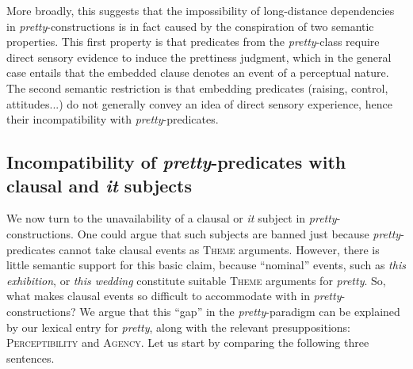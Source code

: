 \documentclass[11pt]{article}
\begin{document}
More broadly, this suggests that the impossibility of long-distance dependencies in \textit{pretty}-constructions is in fact caused by the conspiration of two semantic properties. This first property is that predicates from the \textit{pretty}-class require direct sensory evidence to induce the prettiness judgment, which in the general case entails that the embedded clause denotes an event of a perceptual nature. The second semantic restriction is that embedding predicates (raising, control, attitudes...) do not generally convey an idea of direct sensory experience, hence their incompatibility with \textit{pretty}-predicates.



\subsection{Incompatibility of \textit{pretty}-predicates with clausal and \textit{it} subjects}
We now turn to the unavailability of a clausal or \textit{it} subject in \textit{pretty}-constructions. One could argue that such subjects are banned just because \textit{pretty}-predicates cannot take clausal events as \textsc{Theme} arguments. However, there is little semantic support for this basic claim, because ``nominal'' events, such as \textit{this exhibition}, or \textit{this wedding} constitute suitable \textsc{Theme} arguments for \textit{pretty}. So, what makes clausal events so difficult to accommodate with in \textit{pretty}-constructions? We argue that this ``gap'' in the \textit{pretty}-paradigm can be explained by our lexical entry for \textit{pretty}, along with the relevant presuppositions: \textsc{Perceptibility} and \textsc{Agency}. Let us start by comparing the following three sentences.
\begin{exe}
	\ex 
	\begin{xlist}
		\label{ex:pretty-tangible-dp-interpretable}
		\label{ex:pretty-tangible-gerund-dp-interpretable}
		\label{ex:pretty-tangible-dp-uninterpretable}
	\end{xlist}
\end{exe}
\end{document}
